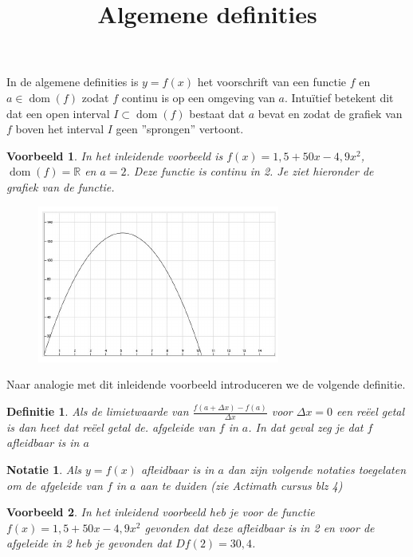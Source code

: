 \documentclass{article}
\title{Algemene definities}
\date { }
\DeclareMathOperator{\dom}{dom}
\newtheorem*{definitie}{Definitie} \newtheorem*{notatie}{Notatie} \newtheorem*{voorbeeld}{Voorbeeld}
\begin{document}
\maketitle \noindent

\noindent In de algemene definities is $y=f(x)$ het voorschrift van een functie $f$ en $a \in \dom (f)$ zodat $f$ continu is op een omgeving van $a$.
Intu\"itief betekent dit dat een open interval $I \subset \dom (f)$ bestaat dat $a$ bevat en zodat de grafiek van $f$ boven het interval $I$ geen ''sprongen'' vertoont.\vspace{5mm}

\begin{voorbeeld}
In het inleidende voorbeeld is $f(x)=1,5+50 x -4,9 x^2$, $\dom (f)= \mathbb{R}$ en $a=2$.
Deze functie is continu in 2. Je ziet hieronder de grafiek van de functie.
\begin{figure}[h]
\begin{center}
\includegraphics[height=5 cm]{graf.JPG}
\end{center}
\end{figure}
\end{voorbeeld}

Naar analogie met dit inleidende voorbeeld introduceren we de volgende definitie.

\begin{definitie}
Als de limietwaarde van $\frac{f(a+\Delta x)-f(a)}{\Delta x}$ voor $\Delta x = 0$ een re\"eel getal is dan heet dat re\"eel getal de. afgeleide van $f$ in $a$.
In dat geval zeg je dat $f$ afleidbaar is in $a$
\end{definitie}

\begin{notatie}
Als $y=f(x)$ afleidbaar is in $a$ dan zijn volgende notaties toegelaten om de afgeleide van $f$ in $a$ aan te duiden (zie Actimath cursus blz 4)
\end{notatie}

\begin{voorbeeld}
In het inleidend voorbeeld heb je voor de functie  $f(x)=1,5+50 x -4,9 x^2$ gevonden dat deze afleidbaar is in 2 en voor de afgeleide in 2 heb je gevonden dat $Df(2)=30,4$.
\end{voorbeeld}\vspace{0,5 cm}
\end{document}
